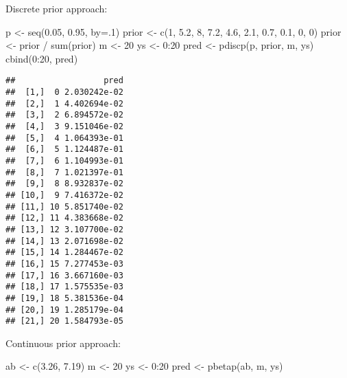 \documentclass[
]{book}
\newenvironment{Shaded}{\begin{snugshade}}{\end{snugshade}}
\newcommand{\AttributeTok}[1]{\textcolor[rgb]{0.77,0.63,0.00}{#1}}
\newcommand{\DecValTok}[1]{\textcolor[rgb]{0.00,0.00,0.81}{#1}}
\newcommand{\FloatTok}[1]{\textcolor[rgb]{0.00,0.00,0.81}{#1}}
\newcommand{\FunctionTok}[1]{\textcolor[rgb]{0.00,0.00,0.00}{#1}}
\newcommand{\NormalTok}[1]{#1}
\newcommand{\OtherTok}[1]{\textcolor[rgb]{0.56,0.35,0.01}{#1}}
\newcommand{\SpecialCharTok}[1]{\textcolor[rgb]{0.00,0.00,0.00}{#1}}
\begin{document}
Discrete prior approach:

\begin{Shaded}
\begin{Highlighting}[]
\NormalTok{p }\OtherTok{\textless{}{-}} \FunctionTok{seq}\NormalTok{(}\FloatTok{0.05}\NormalTok{, }\FloatTok{0.95}\NormalTok{, }\AttributeTok{by=}\NormalTok{.}\DecValTok{1}\NormalTok{)}
\NormalTok{prior }\OtherTok{\textless{}{-}} \FunctionTok{c}\NormalTok{(}\DecValTok{1}\NormalTok{, }\FloatTok{5.2}\NormalTok{, }\DecValTok{8}\NormalTok{, }\FloatTok{7.2}\NormalTok{, }\FloatTok{4.6}\NormalTok{, }
           \FloatTok{2.1}\NormalTok{, }\FloatTok{0.7}\NormalTok{, }\FloatTok{0.1}\NormalTok{, }\DecValTok{0}\NormalTok{, }\DecValTok{0}\NormalTok{)}
\NormalTok{prior }\OtherTok{\textless{}{-}}\NormalTok{ prior }\SpecialCharTok{/} \FunctionTok{sum}\NormalTok{(prior)}
\NormalTok{m }\OtherTok{\textless{}{-}} \DecValTok{20}
\NormalTok{ys }\OtherTok{\textless{}{-}} \DecValTok{0}\SpecialCharTok{:}\DecValTok{20}
\NormalTok{pred }\OtherTok{\textless{}{-}} \FunctionTok{pdiscp}\NormalTok{(p, prior, m, ys)}
\FunctionTok{cbind}\NormalTok{(}\DecValTok{0}\SpecialCharTok{:}\DecValTok{20}\NormalTok{, pred)}
\end{Highlighting}
\end{Shaded}

\begin{verbatim}
##                  pred
##  [1,]  0 2.030242e-02
##  [2,]  1 4.402694e-02
##  [3,]  2 6.894572e-02
##  [4,]  3 9.151046e-02
##  [5,]  4 1.064393e-01
##  [6,]  5 1.124487e-01
##  [7,]  6 1.104993e-01
##  [8,]  7 1.021397e-01
##  [9,]  8 8.932837e-02
## [10,]  9 7.416372e-02
## [11,] 10 5.851740e-02
## [12,] 11 4.383668e-02
## [13,] 12 3.107700e-02
## [14,] 13 2.071698e-02
## [15,] 14 1.284467e-02
## [16,] 15 7.277453e-03
## [17,] 16 3.667160e-03
## [18,] 17 1.575535e-03
## [19,] 18 5.381536e-04
## [20,] 19 1.285179e-04
## [21,] 20 1.584793e-05
\end{verbatim}

Continuous prior approach:

\begin{Shaded}
\begin{Highlighting}[]
\NormalTok{ab }\OtherTok{\textless{}{-}} \FunctionTok{c}\NormalTok{(}\FloatTok{3.26}\NormalTok{, }\FloatTok{7.19}\NormalTok{)}
\NormalTok{m }\OtherTok{\textless{}{-}} \DecValTok{20}
\NormalTok{ys }\OtherTok{\textless{}{-}} \DecValTok{0}\SpecialCharTok{:}\DecValTok{20}
\NormalTok{pred }\OtherTok{\textless{}{-}} \FunctionTok{pbetap}\NormalTok{(ab, m, ys)}
\end{Highlighting}
\end{Shaded}
\end{document}
